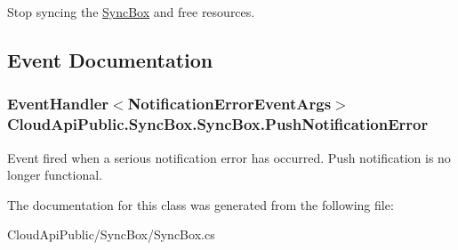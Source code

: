 Stop syncing the \hyperlink{class_cloud_api_public_1_1_sync_box_1_1_sync_box}{Sync\-Box} and free resources. 



\subsection{Event Documentation}
\hypertarget{class_cloud_api_public_1_1_sync_box_1_1_sync_box_a8ddba93f4254b9ebfd56277ace63ff68}{
\subsubsection[{Push\-Notification\-Error}]{\setlength{\rightskip}{0pt plus 5cm}Event\-Handler$<${\bf Notification\-Error\-Event\-Args}$>$ Cloud\-Api\-Public.\-Sync\-Box.\-Sync\-Box.\-Push\-Notification\-Error}}\label{class_cloud_api_public_1_1_sync_box_1_1_sync_box_a8ddba93f4254b9ebfd56277ace63ff68}


Event fired when a serious notification error has occurred. Push notification is no longer functional. 



The documentation for this class was generated from the following file\-:\begin{DoxyCompactItemize}
\item 
Cloud\-Api\-Public/\-Sync\-Box/Sync\-Box.\-cs\end{DoxyCompactItemize}
